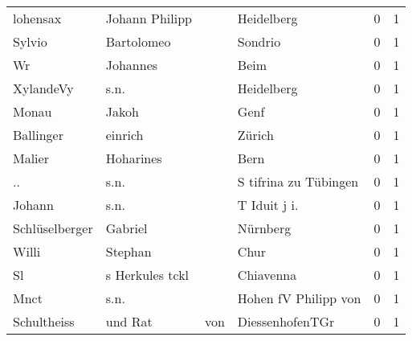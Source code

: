 \documentclass[10pt,a4paper,landscape]{article}
\begin{document}
\begin{longtable}{llllrr}
                 lohensax &                     Johann Philipp &             &                                  Heidelberg &          0 &         1 \\
                   Sylvio &                         Bartolomeo &             &                                     Sondrio &          0 &         1 \\
                       Wr &                           Johannes &             &                                        Beim &          0 &         1 \\
                XylandeVy &                               s.n. &             &                                  Heidelberg &          0 &         1 \\
                    Monau &                              Jakoh &             &                                        Genf &          0 &         1 \\
                Ballinger &                            einrich &             &                                      Zürich &          0 &         1 \\
                   Malier &                          Hoharines &             &                                        Bern &          0 &         1 \\
                       .. &                               s.n. &             &                       S tifrina zu Tübingen &          0 &         1 \\
                   Johann &                               s.n. &             &                               T Iduit j i.  &          0 &         1 \\
           Schlüselberger &                            Gabriel &             &                                    Nürnberg &          0 &         1 \\
                    Willi &                            Stephan &             &                                        Chur &          0 &         1 \\
                       Sl &                    s Herkules tckl &             &                                   Chiavenna &          0 &         1 \\
                     Mnct &                               s.n. &             &                        Hohen fV Philipp von &          0 &         1 \\
              Schultheiss &                            und Rat &         von &                             DiessenhofenTGr &          0 &         1 \\

\end{longtable}
\end{document}
